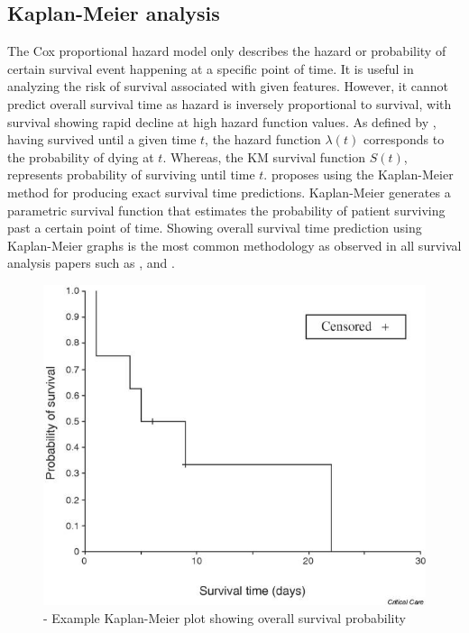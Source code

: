 \documentclass{l4proj}
\begin{document}
\subsection{Kaplan-Meier analysis} \label{km-background}
The Cox proportional hazard model only describes the hazard or probability of certain survival event happening at a specific point of time. It is useful in analyzing the risk of survival associated with given features. However, it cannot predict overall survival time as hazard is inversely proportional to survival, with survival showing rapid decline at high hazard function values. As defined by \cite{bewick2004statistics}, having survived until a given time \(t\), the hazard function \(\lambda (t)\) corresponds to the probability of dying at \(t\). Whereas, the KM survival function \(S(t)\), represents probability of surviving until time \(t\). \cite{schober2021kaplan} proposes using the Kaplan-Meier method for producing exact survival time predictions. Kaplan-Meier generates a parametric survival function that estimates the probability of patient surviving past a certain point of time. Showing overall survival time prediction using Kaplan-Meier graphs is the most common methodology as observed in all survival analysis papers such as \cite{Kather2019}, \cite{Liu2022} and \cite{Wetstein2022}.

\begin{figure}[h]
    \centering
    \includegraphics[scale=0.3]{images/KM-plot-example.jpg}
    \caption{\cite{bewick2004statistics} - Example Kaplan-Meier plot showing overall survival probability }
    \label{fig:km-plot-example}
\end{figure}
\end{document}
